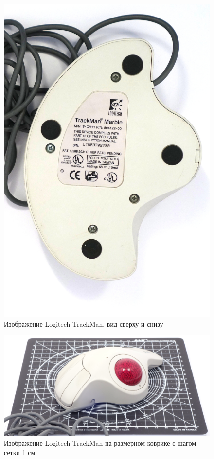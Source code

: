 \documentclass[11pt, a4paper]{article}
\begin{document}
\begin{figure}[h]
    \includegraphics[scale=0.4]{1995_logitech_trackman/bottom_60.jpg}
    \caption{Изображение Logitech TrackMan, вид сверху и снизу}
    \label{fig:trackmanTopAndBottom}
\end{figure}

\begin{figure}[h]
    \centering
    \includegraphics[scale=0.4]{1995_logitech_trackman/size_30.jpg}
    \caption{Изображение Logitech TrackMan на размерном коврике с шагом сетки 1 см}
    \label{fig:trackmanSize}
\end{figure}
\end{document}

